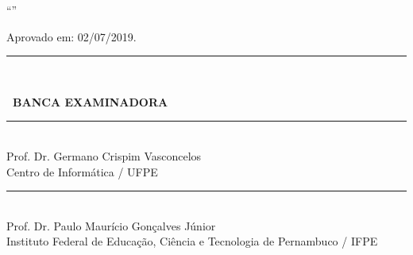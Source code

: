 
\thispagestyle{empty}
\begin{center}

    \textbf{{\ABNTEXchapterfont\fontsize{12}{12}\selectfont\imprimirautor}}
	
    \vspace{0.5cm}
    \begin{center}
      ``\ABNTEXchapterfont\fontsize{12}{12}\selectfont\imprimirtitulo''
    \end{center}
    \vspace{0.5cm}
	

      \hspace{.20\textwidth}
      \begin{minipage}{.55\textwidth}
      	\SingleSpacing
         \imprimirpreambuloatadefesa
       \end{minipage}%
       
    \vspace{0.5cm}
    \begin{flushleft}
    {\fontsize{12}{12}\selectfont Aprovado em: 02/07/2019.}
    \vspace{0.5cm}
    \par\noindent\rule{0.6\textwidth}{0.4pt}\\
    {\bfseries\fontsize{12}{12}\selectfont\imprimirorientador\par}
    \end{flushleft}

     \vspace{1cm}
     
    {\bfseries\fontsize{12}{12}\selectfont\ BANCA EXAMINADORA}
    
    \vspace{1cm}
    
        
		{\SingleSpacing
		\par\noindent\rule{0.6\textwidth}{0.4pt}\\
		Prof. Dr. Germano Crispim Vasconcelos\\
		Centro de Informática / UFPE}
        
        \vspace{0.2cm}
        {\SingleSpacing
		\par\noindent\rule{0.6\textwidth}{0.4pt}\\
		Prof. Dr. Paulo Maurício Gonçalves Júnior\\
		Instituto Federal de Educação, Ciência e Tecnologia de Pernambuco / IFPE}
		

\end{center}
